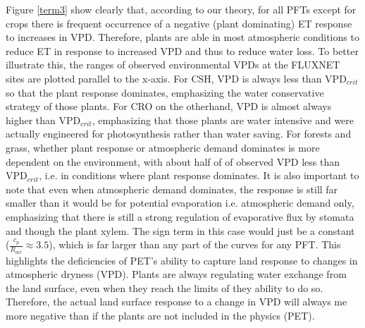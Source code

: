 \documentclass[draft,linenumbers]{agujournal}
\begin{document}
Figure \ref{term3} show clearly that, according to our theory, for all PFTs except for crops there is frequent occurrence of a negative (plant dominating) ET response to increases in VPD. Therefore, plants are able in most atmospheric conditions to reduce ET in response to increased VPD and thus to reduce water loss. To better illustrate this, the ranges of observed environmental VPDs at the FLUXNET sites are plotted parallel to the x-axis. For CSH, VPD is always less than VPD$_{crit}$ so that the plant response dominates, emphasizing the water conservative strategy of those plants. For CRO on the otherhand, VPD is almost always higher than VPD$_{crit}$, emphasizing that those plants are water intensive and were actually engineered for photosynthesis rather than water saving. For forests and grass, whether plant response or atmospheric demand dominates is more dependent on the environment, with about half of of observed VPD less than VPD$_{crit}$, i.e. in conditions where plant response dominates. It is also important to note that even when atmospheric demand dominates, the response is still far smaller than it would be for potential evaporation i.e. atmospheric demand only, emphasizing that there is still a strong regulation of evaporative flux by stomata and though the plant xylem. The sign term in this case would just be a constant ($\frac{c_p}{R_{air}} \approx 3.5$), which is far larger than any part of the curves for any PFT. This highlights the deficiencies of PET's ability to capture land response to changes in atmospheric dryness (VPD). Plants are always regulating water exchange from the land surface, even when they reach the limits of they ability to do so. Therefore, the actual land surface response to a change in VPD will always me more negative than if the plants are not included in the physics (PET). 
\end{document}
